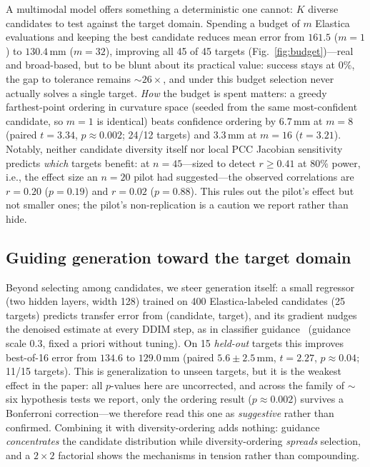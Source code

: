 A multimodal model offers something a deterministic one cannot: $K$ diverse
candidates to test against the target domain. Spending a budget of $m$
Elastica evaluations and keeping the best candidate reduces mean error from
$161.5$ ($m{=}1$) to $130.4\,$mm ($m{=}32$), improving all 45 of 45 targets
(Fig.~\ref{fig:budget})---real and broad-based, but to be blunt about its
practical value: success stays at $0\%$, the gap to tolerance remains
${\sim}26\times$, and under this budget selection never actually solves a
single target. \emph{How} the
budget is spent matters: a greedy farthest-point ordering in curvature space
(seeded from the same most-confident candidate, so $m{=}1$ is identical)
beats confidence ordering by $6.7\,$mm at $m{=}8$ (paired $t{=}3.34$,
$p{\approx}0.002$; 24/12 targets) and $3.3\,$mm at $m{=}16$ ($t{=}3.21$).
Notably, neither candidate diversity itself nor local PCC Jacobian
sensitivity predicts \emph{which} targets benefit: at $n{=}45$---sized to
detect $r{\geq}0.41$ at $80\%$ power, i.e., the effect size an $n{=}20$
pilot had suggested---the observed correlations are $r{=}0.20$ ($p{=}0.19$)
and $r{=}0.02$ ($p{=}0.88$). This rules out the pilot's effect but not
smaller ones; the pilot's non-replication is a caution we report rather
than hide.

\subsection{Guiding generation toward the target domain}
Beyond selecting among candidates, we steer generation itself: a small
regressor (two hidden layers, width 128) trained on 400 Elastica-labeled
candidates (25 targets) predicts
transfer error from (candidate, target), and its gradient nudges the
denoised estimate at every DDIM step, as in classifier
guidance~\cite{dhariwal2021diffusion} (guidance scale $0.3$, fixed a priori
without tuning). On 15 \emph{held-out} targets this
improves best-of-16 error from $134.6$ to $129.0\,$mm (paired
$5.6\pm2.5\,$mm, $t{=}2.27$, $p{\approx}0.04$; 11/15 targets). This is
generalization to unseen targets, but it is the weakest effect in the
paper: all $p$-values here are uncorrected, and across the family of
${\sim}$six hypothesis tests we report, only the ordering result
($p{\approx}0.002$) survives a Bonferroni correction---we therefore read
this one as \emph{suggestive} rather than confirmed.
Combining it with diversity-ordering adds nothing: guidance
\emph{concentrates} the candidate distribution while diversity-ordering
\emph{spreads} selection, and a $2\times2$ factorial shows the mechanisms in
tension rather than compounding.

